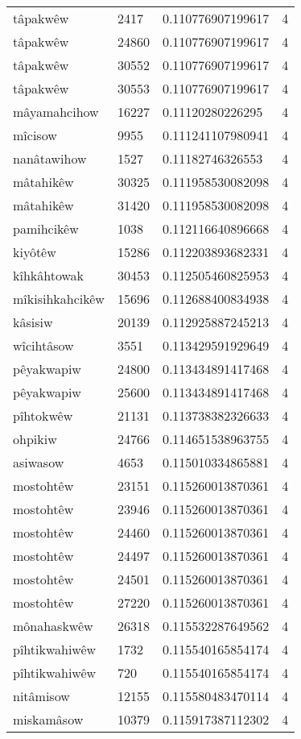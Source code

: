 \begin{longtable}{llll}
tâpakwêw & 2417 & 0.110776907199617 & 4 \\
tâpakwêw & 24860 & 0.110776907199617 & 4 \\
tâpakwêw & 30552 & 0.110776907199617 & 4 \\
tâpakwêw & 30553 & 0.110776907199617 & 4 \\
mâyamahcihow & 16227 & 0.11120280226295 & 4 \\
mîcisow & 9955 & 0.111241107980941 & 4 \\
nanâtawihow & 1527 & 0.11182746326553 & 4 \\
mâtahikêw & 30325 & 0.111958530082098 & 4 \\
mâtahikêw & 31420 & 0.111958530082098 & 4 \\
pamihcikêw & 1038 & 0.112116640896668 & 4 \\
kiyôtêw & 15286 & 0.112203893682331 & 4 \\
kîhkâhtowak & 30453 & 0.112505460825953 & 4 \\
mîkisihkahcikêw & 15696 & 0.112688400834938 & 4 \\
kâsisiw & 20139 & 0.112925887245213 & 4 \\
wîcihtâsow & 3551 & 0.113429591929649 & 4 \\
pêyakwapiw & 24800 & 0.113434891417468 & 4 \\
pêyakwapiw & 25600 & 0.113434891417468 & 4 \\
pîhtokwêw & 21131 & 0.113738382326633 & 4 \\
ohpikiw & 24766 & 0.114651538963755 & 4 \\
asiwasow & 4653 & 0.115010334865881 & 4 \\
mostohtêw & 23151 & 0.115260013870361 & 4 \\
mostohtêw & 23946 & 0.115260013870361 & 4 \\
mostohtêw & 24460 & 0.115260013870361 & 4 \\
mostohtêw & 24497 & 0.115260013870361 & 4 \\
mostohtêw & 24501 & 0.115260013870361 & 4 \\
mostohtêw & 27220 & 0.115260013870361 & 4 \\
mônahaskwêw & 26318 & 0.115532287649562 & 4 \\
pîhtikwahiwêw & 1732 & 0.115540165854174 & 4 \\
pîhtikwahiwêw & 720 & 0.115540165854174 & 4 \\
nitâmisow & 12155 & 0.115580483470114 & 4 \\
miskamâsow & 10379 & 0.115917387112302 & 4 \\

\end{longtable}
